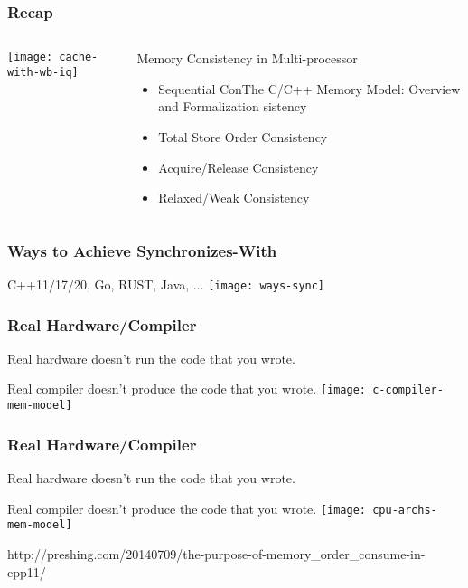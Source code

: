 \begin{frame}[plain]	
    \frametitle{Recap}
    
    
    \begin{columns}
        
        \begin{column}{.4\textwidth}
            \texttt{[image: cache-with-wb-iq]}
        \end{column}
        \begin{column}{.6\textwidth}
			
\Large
 Memory Consistency in Multi-processor
\begin{itemize}
    \item Sequential ConThe C/C++ Memory Model:
    Overview and Formalization
    sistency
    \item  Total Store Order Consistency
    \item Acquire/Release Consistency
    
    \item Relaxed/Weak Consistency
    
    
\end{itemize}
        \end{column}
    \end{columns}
    
\end{frame}

\begin{frame}
    \frametitle{Ways to Achieve Synchronizes-With}
    C++11/17/20, Go, RUST, Java, ...
    \texttt{[image: ways-sync]}
\end{frame}

\begin{frame}
  \frametitle{Real Hardware/Compiler}
    Real hardware doesn’t run the code that you wrote.
    
    Real compiler doesn’t produce the code that you wrote.
    \texttt{[image: c-compiler-mem-model]}
\end{frame}


\begin{frame}
    \frametitle{Real Hardware/Compiler}
    Real hardware doesn’t run the code that you wrote.
    
    Real compiler doesn’t produce the code that you wrote.
    \texttt{[image: cpu-archs-mem-model]}
    
        \tiny
    http://preshing.com/20140709/the-purpose-of-memory\_order\_consume-in-cpp11/
    
\end{frame}

